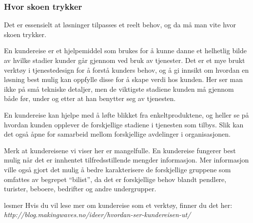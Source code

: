\documentclass[xetex]{beamer}
\begin{document}
\begin{frame}\label{fr:kundereise}
	\frametitle{Hvor skoen trykker}
	Det er \alert{essensielt at løsninger tilpasses et reelt behov}, og da må man vite hvor skoen trykker. 
	
	En kundereise er et hjelpemiddel som brukes for å kunne danne et \alert{helhetlig} bilde av hvilke stadier kunder går gjennom ved bruk av tjenester. Det er et mye brukt verktøy i tjenestedesign for å forstå \alert{kunders behov}, og å gi innsikt om hvordan en løsning best mulig kan oppfylle disse for å skape \alert{verdi} hos kunden. Her ser man ikke på små tekniske detaljer, men de viktigste stadiene kunden må gjennom både før, under og etter at han benytter seg av tjenesten. 

	En kundereise kan hjelpe med å løfte blikket fra enkeltproduktene, og heller se på hvordan kunden opplever de forskjellige stadiene i tjenesten som tilbys. Slik kan det også åpne for samarbeid mellom forskjellige avdelinger i organisasjonen. 

	Merk at kundereisene vi viser her er mangelfulle. En kundereise fungerer best mulig når det er innhentet tilfredsstillende mengder informasjon. Mer informasjon ville også gjort det mulig å bedre karakterisere de forskjellige gruppene som omfattes av begrepet “bilist”, da det er forskjellige behov blandt pendlere, turister, beboere, bedrifter og andre undergrupper. 



	\hfill\begin{beamercolorbox}[wd=0.69\textwidth, ht=6.8ex, dp=10pt, leftskip=.3cm, rightskip=.3cm]{lesmer}
	Hvis du vil lese mer om kundereise som et verktøy, finner du det her:
	\emph{http://blog.makingwaves.no/ideer/hvordan-ser-kundereisen-ut/}
\end{beamercolorbox}
\end{frame}
\end{document}

